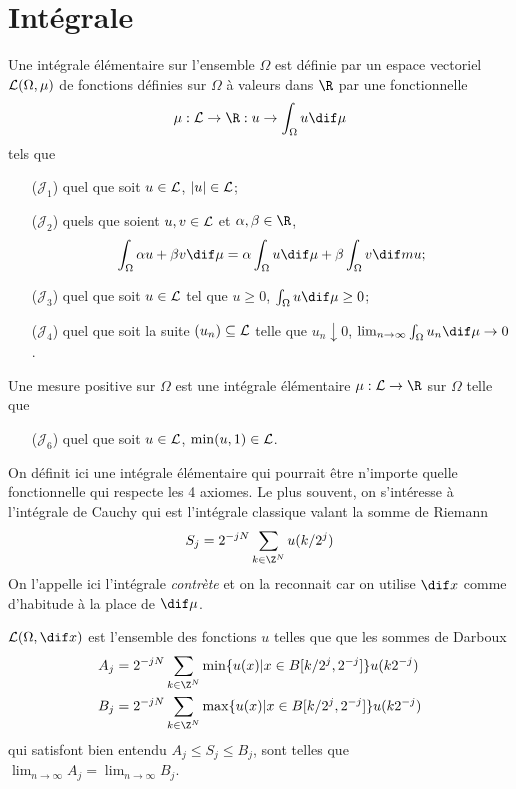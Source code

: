 \section{Intégrale}
\begin{mydef}[Mesure 6.1]
  Une intégrale élémentaire sur l'ensemble $\Omega$ est définie par un
  espace vectoriel $\mathcal{L}(\Omega,\mu)$ de fonctions définies sur $\Omega$
  à valeurs dans $\R$ par une fonctionnelle
  \[ \mu : \Le \to \R : u \to \int_\Omega u \dif \mu \]
  tels que
  \begin{enumerate}
    \item[($\mathcal{J}_1$)] quel que soit $u \in \mathcal{L}$, $|u| \in \mathcal{L}$;
    \item[($\mathcal{J}_2$)] quels que soient $u,v \in \mathcal{L}$ et $\alpha,\beta \in \R$,
      \[ \int_\Omega \alpha u + \beta v \dif \mu = \alpha \int_\Omega u \dif \mu + \beta \int_\Omega v \dif mu; \]
    \item[($\mathcal{J}_3$)] quel que soit $u \in \mathcal{L}$ tel que $u \geq 0$, $\int_\Omega u \dif \mu \geq 0$;
    \item[($\mathcal{J}_4$)] quel que soit la suite $(u_n) \subseteq \mathcal{L}$ telle que $u_n \downarrow 0$,
      $\lim_{n\to\infty} \int_\Omega u_n \dif \mu \to 0$.
  \end{enumerate}
\end{mydef}

\begin{mydef}
  Une mesure positive sur $\Omega$ est une intégrale élémentaire $\mu:\Le \to \R$ sur $\Omega$
  telle que
  \begin{enumerate}
    \item[($\mathcal{J}_6$)] quel que soit $u \in \mathcal{L}$, $\min(u,1) \in \mathcal{L}$.
  \end{enumerate}
\end{mydef}

On définit ici une intégrale élémentaire qui pourrait être n'importe quelle fonctionnelle
qui respecte les 4 axiomes.
Le plus souvent, on s'intéresse à l'intégrale de Cauchy qui est l'intégrale classique
valant la somme de Riemann
\[ S_j = 2^{-jN} \sum_{k \in \Z^N} u(k/2^j) \]
On l'appelle ici l'intégrale \emph{contrète} et on la reconnait car on utilise
$\dif x$ comme d'habitude à la place de $\dif \mu$.

$\Le(\Omega,\dif x)$ est l'ensemble des fonctions $u$ telles que
que les sommes de Darboux
\begin{align*}
  A_j & = 2^{-jN} \sum_{k \in \Z^N} \min\{u(x) | x \in B[k/2^{j},2^{-j}]\}u(k2^{-j})\\
  B_j & = 2^{-jN} \sum_{k \in \Z^N} \max\{u(x) | x \in B[k/2^{j},2^{-j}]\}u(k2^{-j})
\end{align*}
qui satisfont bien entendu $A_j \leq S_j \leq B_j$, sont telles que
$\lim_{n\to\infty} A_j = \lim_{n\to\infty} B_j$.

